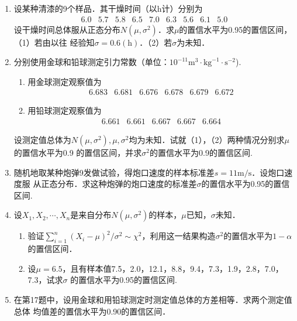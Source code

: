 \documentclass[10pt,a4paper]{article}
\begin{document}
\begin{enumerate}
    \item 设某种清漆的9个样品．其干燥时间（以h计）分别为
    $$\begin{array}{ccccccccc}
        6.0 & 5.7 & 5.8 & 6.5 & 7.0 & 6.3 & 5.6 & 6.1 & 5.0
    \end{array}$$
    设干燥时间总体服从正态分布$N(\mu,\sigma^2)$．求$\mu$的置信水平为0.95的置信区间，（1）若由以往
    经验知$\sigma=0.6(\mathrm{h})$．（2）若$\sigma$为未知．




    \item 分别使用金球和铅球测定引力常数（单位：$10^{-11}\mathrm{m}^3\cdot\mathrm{kg}^{-1}\cdot\mathrm{s}^{-2}$).
    \begin{enumerate}
        \item 用金球测定观察值为
        $$\begin{array}{cccccc}
            6.683 & 6.681 & 6.676 & 6.678 & 6.679 & 6.672
        \end{array}$$
        \item 用铅球测定观察值为
        $$\begin{array}{ccccc}
            6.661 & 6.661 & 6.667 & 6.667 & 6.664 
        \end{array}$$
    \end{enumerate}
    设测定值总体为$N(\mu,\sigma^2),\mu,\sigma^2$均为未知．试就（1），（2）两种情况分别求$\mu$的置信水平为0.9
    的置信区间，并求$\sigma^2$的置信水平为0.9的置信区间.




    \item 随机地取某种炮弹9发做试验，得炮口速度的样本标准差$s=11\mathrm{m}/\mathrm{s}$．设炮口速度服
    从正态分布．求这种炮弹的炮口速度的标准差$\sigma$的置信水平为0.95的置信区间.




    \item 设$X_1,X_2,\cdots,X_n$是来自分布$N(\mu,\sigma^2)$的样本，$\mu$已知，$\sigma$未知．
    \begin{enumerate}
        \item 验证$\displaystyle{\sum_{i=1}^n (X_i-\mu)^2/\sigma^2}\sim \chi^2$，利用这一结果构造$\sigma^2$的置信水平为$1-\alpha$的置信区间．
        \item 设$\mu=6.5$，且有样本值7.5，2.0，12.1，8.8，9.4，7.3，1.9，2.8，7.0，7.3，试求$\sigma$
        的置信水平为0.95的置信区间.
    \end{enumerate}



    \item 在第17题中，设用金球和用铅球测定时测定值总体的方差相等．求两个测定值总体
    均值差的置信水平为0.90的置信区间．





\end{enumerate}
\end{document}
